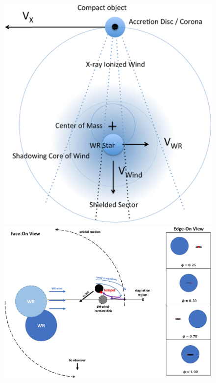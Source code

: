 \documentclass[a4paper,titlepage]{book}     	%
\begin{document}
\begin{figure}[t!]
	\begin{minipage}{.39\textwidth}
		\centering
		\includegraphics[width=\textwidth]{./images/WRwindIC10X-1.png}
	\end{minipage}
	\hfill
	\begin{minipage}{.60\textwidth}
		\centering
		\includegraphics[width=\textwidth]{./images/WRwindNGC300.png}	

\end{minipage}
\end{figure}
\end{document}
